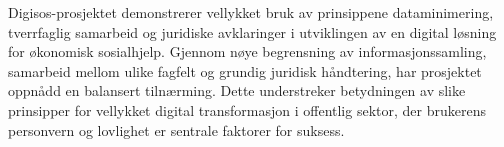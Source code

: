 \documentclass[a4paper, 12pt]{article}  %
\begin{document}
Digisos-prosjektet demonstrerer vellykket bruk av prinsippene dataminimering, tverrfaglig samarbeid og juridiske avklaringer i utviklingen av en digital løsning for økonomisk sosialhjelp.
Gjennom nøye begrensning av informasjonssamling, samarbeid mellom ulike fagfelt og grundig juridisk håndtering, har prosjektet oppnådd en balansert tilnærming.
Dette understreker betydningen av slike prinsipper for vellykket digital transformasjon i offentlig sektor, der brukerens personvern og lovlighet er sentrale faktorer for suksess.

\printbibliography[heading=bibintoc] %
\end{document}
